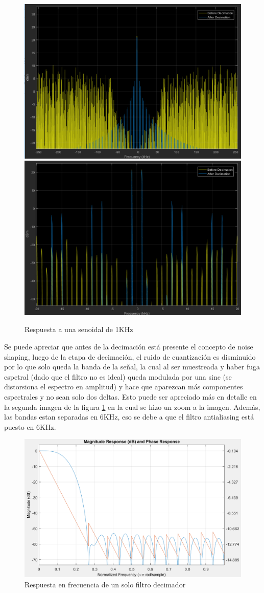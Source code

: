 \documentclass[assd_tp3_main.tex]{subfiles}
\begin{document}
\begin{figure}[H]
\centering
\includegraphics[width=0.7\linewidth]{images/ej4/sin_response_1K.png}
\includegraphics[width=0.7\linewidth]{images/ej4/sin_response_1K_zoom.png}
\caption{Respuesta a una senoidal de 1KHz}
\label{fig:sin_response_1K}
\end{figure}
Se puede apreciar que antes de la decimación está presente el concepto de noise shaping, luego de la etapa de decimación, el ruido de cuantización es disminuido por lo que solo queda la banda de la señal, la cual al ser muestreada y haber fuga espetral (dado que el filtro no es ideal) queda modulada por una sinc (se distorsiona el espectro en amplitud) y hace que aparezcan más componentes espectrales y no sean solo dos deltas. Esto puede ser apreciado más en detalle en la segunda imagen de la figura \ref{fig:sin_response_1K} en la cual se hizo un zoom a la imagen. Además, las bandas estan separadas en 6KHz, eso se debe a que el filtro antialiasing está puesto en 6KHz.

\begin{figure}[H]
\centering
\includegraphics[width=0.8\linewidth]{images/ej4/Decimation_1filt.png}
\caption{Respuesta en frecuencia de un solo filtro decimador}
\label{fig:Decimation_1filt}
\end{figure}
\end{document}
